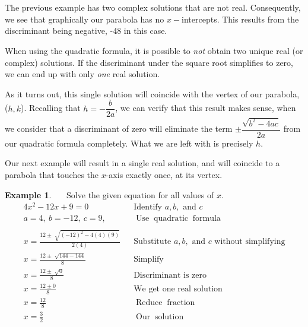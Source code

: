 \documentclass[12pt]{book}
\theoremstyle{definition}
\newtheorem{example}{Example}
\newcommand{\tmop}[1]{\ensuremath{\operatorname{#1}}}
\begin{document}
\begin{multicols}{2}
\begin{center}
\end{center}
\columnbreak
\ \par
\ \par
The previous example has two complex solutions that are not real.  Consequently, we see that graphically our parabola has no $x-$intercepts.  This results from the discriminant being negative, -48 in this case.
\end{multicols}
When using the quadratic formula, it is possible to {\it not} obtain two unique real (or complex) solutions.  If the discriminant under the square root simplifies to zero, we can end up with only {\it one} real solution.\par
As it turns out, this single solution will coincide with the vertex of our parabola, ($h,k$).  Recalling that $h=-\dfrac{b}{2a}$, we can verify that this result makes sense, when we consider that a discriminant of zero will eliminate the term $\pm\dfrac{\sqrt{b^2-4ac}}{2a}$ from our quadratic formula completely.  What we are left with is precisely $h$.\par
Our next example will result in a single real solution, and will coincide to a parabola that touches the $x$-axis exactly once, at its vertex. 
\begin{example}~~~Solve the given equation for all values of $x$.
   \begin{eqnarray*}
    4 x^2 - 12 x + 9 = 0 &  & \text{Identify~} a,b, \text{~and~}c\\
		 a = 4,~ b = - 12,~ c = 9, & & \tmop{Use} \tmop{quadratic} \tmop{formula}\\
		& & \\
    x = \frac{12 \pm \sqrt[]{(- 12)^2 - 4 (4) (9)}}{2 (4)} &  &\text{Substitute~} a,b, \text{~and~} c \text{~without~simplifying}\\
    x = \frac{12 \pm \sqrt[]{144 - 144}}{8} &  & \tmop{Simplify}\\
    x = \frac{12 \pm \sqrt[]{0}}{8} &  & \tmop{Discriminant~is~zero}\\
    x = \frac{12 \pm 0}{8} &  & \tmop{We~get~one~real~solution}\\
    x = \frac{12}{8} &  & \tmop{Reduce} \tmop{fraction}\\
    x = \frac{3}{2} &  & \tmop{Our} \tmop{solution}
  \end{eqnarray*}
\end{example}
\end{document}

